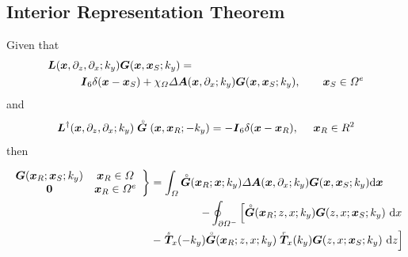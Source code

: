 \subsection{Interior Representation Theorem}
{} Given that
 \begin{eqnarray*}
\lefteqn{{\bmi L}({\bmi x},\partial_{z},\partial_{x};k_y) {\bmi G}({\bmi
x},{\bmi x}_{S};k_y) =}\\
&&\qquad {\bmi I}_{6}\delta({\bmi x}-{\bmi x}_{S}) + 
{\chi}_{{{\mit \Omega}}} {\mit \Delta} {\bmi A}({\bmi
x},\partial_{x};k_y) {\bmi G}({\bmi x},{\bmi x}_{S};k_y),\qquad {\bmi 
x}_{S}\in{\mit \Omega}^{e}
\end{eqnarray*}
and
\begin{displaymath}
{\bmi L}^{\dagger}({\bmi x},\partial_{z},\partial_{x};k_y) \rf{\bmi G}({\bmi
x},{\bmi x}_{R};-k_y) = -{\bmi I}_{6}\delta({\bmi x}-{\bmi x}_{R}),\ \ \ \ {\bmi 
x}_{R}\in{R}^{2}
\end{displaymath}
then

\begin{samepage}
\begin{eqnarray*}
\lefteqn{
\left.
\begin{array}{cc}
{{\bmi G}}({\bmi x}_{R};{\bmi x}_{S};k_y)& {\bmi x}_{R}\in {\mit \Omega}\\
{\bf 0}&{\bmi x}_{R}\in {\mit \Omega}^{e}
\end{array}  \right\}
=\int_{{\mit \Omega}} {\rf{\bmi G}}({\bmi x}_{R};{\bmi x};k_y)
{\mit \Delta} {\bmi A}({\bmi
x},\partial_{x};k_y) {\bmi G}({\bmi x},{\bmi x}_{S};k_y) {\rm d}{\bmi x}
}\\
&&
\qquad\qquad\qquad\qquad\qquad\qquad
-\oint_{\partial {\mit \Omega}^{-}} \left[ {\rf{\bmi G}}({\bmi x}_{R};{z, x};k_y) 
{{\bmi G}}({z, x};{\bmi x}_{S};k_y) \  {\rm d}x \right.\\
&&
\qquad\qquad\qquad\qquad\qquad\qquad
- \left.\stackrel{\scriptscriptstyle _s}{\bmi T}{}_{\!\!\! x}(-k_y){\rf{\bmi 
G}}({\bmi x}_{R};{z, x};k_y)  
\stackrel{\scriptscriptstyle _r}{\bmi T}{}_{\!\!\! x}(k_y){{\bmi G}}({z, 
x};{\bmi x}_{S};k_y) \ {\rm d}z \right]
\end{eqnarray*}
\end{samepage}

